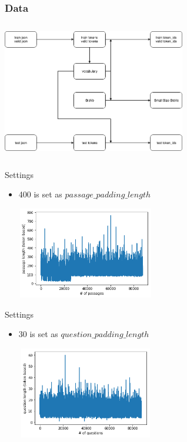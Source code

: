 \documentclass{beamer}
\begin{document}
\begin{frame}\frametitle{Data}
    \begin{center}
        \includegraphics[width=8cm, height=6cm]{figures/data.png}
    \end{center}
\end{frame}

\begin{frame}{Settings}
    \begin{itemize}
        \item 400 is set as $passage\_padding\_length$
            \begin{center}
                \includegraphics[width=6cm, height=4cm]{figures/passage_length.png}
            \end{center}
    \end{itemize}
\end{frame}

\begin{frame}{Settings}
    \begin{itemize}
        \item 30 is set as $question\_padding\_length$
            \begin{center}
                \includegraphics[width=6cm, height=4cm]{figures/question_length.png}
            \end{center}
    \end{itemize}
\end{frame}
\end{document}
